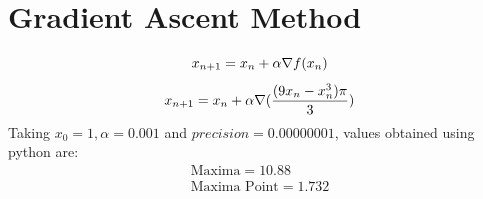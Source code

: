 \documentclass[journal,10pt,twocolumn]{article}
\begin{document}
  


\section*{\large Gradient Ascent Method}

\begin{equation}
        x_{n+1} = x_n + \alpha \nabla f(x_n) \\
\end{equation}
\begin{equation}
        x_{n+1} = x_n + \alpha \nabla (\frac{(9x_n-x_n^3)\pi}{3}) \\
\end{equation}
 Taking $x_0 = 1, \alpha = 0.001$ and $precision = 0.00000001$, values obtained using python are:
\begin{align}
\boxed{\text{Maxima} = 10.88} \\
\boxed{\text{Maxima Point} = 1.732}
\end{align}
\end{document}
